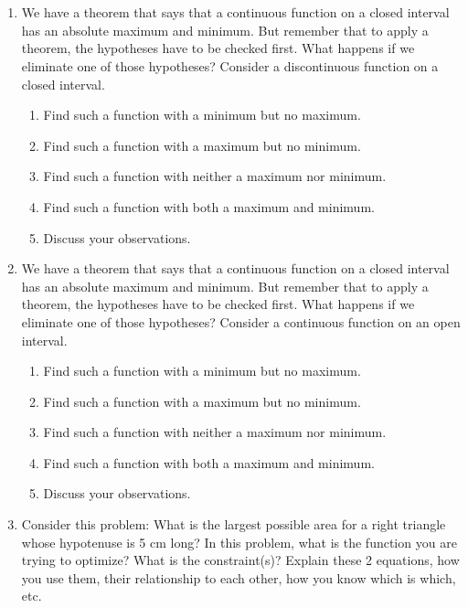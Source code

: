 \chapter{}
\section{}\begin{enumerate}%

\item  We have a theorem that says that a continuous function on a closed interval has an absolute maximum and minimum.  But remember that to apply a theorem, the hypotheses have to be checked first.  What happens if we eliminate one of those hypotheses?  Consider a discontinuous function on a closed interval.
\begin{enumerate}
	\item Find such a function with a minimum but no maximum.
	\item Find such a function with a maximum but no minimum.
	\item Find such a function with neither a maximum nor minimum.
	\item Find such a function with both a maximum and minimum.  \cite{SBS}
	\item Discuss your observations.
\end{enumerate}

\item  We have a theorem that says that a continuous function on a closed interval has an absolute maximum and minimum.  But remember that to apply a theorem, the hypotheses have to be checked first.  What happens if we eliminate one of those hypotheses?  Consider a continuous function on an open interval.
\begin{enumerate}
	\item  Find such a function with a minimum but no maximum.
	\item Find such a function with a maximum but no minimum.
	\item Find such a function with neither a maximum nor minimum.
	\item Find such a function with both a maximum and minimum.  \cite{SBS}
	\item Discuss your observations. 
\end{enumerate}

\item  Consider this problem: What is the largest possible area for a right triangle whose hypotenuse is 5 cm long?  In this problem, what is the function you are trying to optimize?  What is the constraint(s)?  Explain these 2 equations, how you use them, their relationship to each other, how you know which is which, etc.



\end{enumerate}
